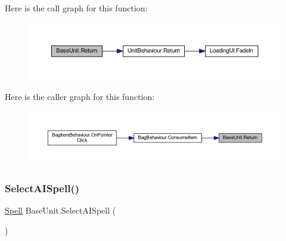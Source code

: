 Here is the call graph for this function\+:
\nopagebreak
\begin{figure}[H]
\begin{center}
\leavevmode
\includegraphics[width=350pt]{class_base_unit_a3091e5ab7a6bd3488f9c0987208a1f4d_cgraph}
\end{center}
\end{figure}
Here is the caller graph for this function\+:
\nopagebreak
\begin{figure}[H]
\begin{center}
\leavevmode
\includegraphics[width=350pt]{class_base_unit_a3091e5ab7a6bd3488f9c0987208a1f4d_icgraph}
\end{center}
\end{figure}
\mbox{\label{class_base_unit_a94ba01b61de9b22ba2431a47caf13cd5}} 
\subsubsection{\texorpdfstring{SelectAISpell()}{SelectAISpell()}}
{\footnotesize\ttfamily \mbox{\hyperlink{class_spell}{Spell}} Base\+Unit.\+Select\+A\+I\+Spell (\begin{DoxyParamCaption}{ }\end{DoxyParamCaption})}

